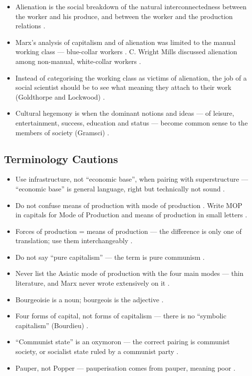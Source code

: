 \begin{itemize}
    \item Alienation is the social breakdown of the natural interconnectedness between the worker and his produce, and between the worker and the production relations .
    \item Marx's analysis of capitalism and of alienation was limited to the manual working class --- blue-collar workers . C. Wright Mills discussed alienation among non-manual, white-collar workers .
    \item Instead of categorising the working class as victims of alienation, the job of a social scientist should be to see what meaning they attach to their work (Goldthorpe and Lockwood) .
    \item Cultural hegemony is when the dominant notions and ideas --- of leisure, entertainment, success, education and status --- become common sense to the members of society (Gramsci) .
\end{itemize}

\subsection{Terminology Cautions}
\begin{itemize}
    \item Use infrastructure, not ``economic base'', when pairing with superstructure --- ``economic base'' is general language, right but technically not sound .
    \item Do not confuse means of production with mode of production . Write MOP in capitals for Mode of Production and means of production in small letters .
    \item Forces of production = means of production --- the difference is only one of translation; use them interchangeably .
    \item Do not say ``pure capitalism'' --- the term is pure communism .
    \item Never list the Asiatic mode of production with the four main modes --- thin literature, and Marx never wrote extensively on it .
    \item Bourgeoisie is a noun; bourgeois is the adjective .
    \item Four forms of capital, not forms of capitalism --- there is no ``symbolic capitalism'' (Bourdieu) .
    \item ``Communist state'' is an oxymoron --- the correct pairing is communist society, or socialist state ruled by a communist party .
    \item Pauper, not Popper --- pauperisation comes from pauper, meaning poor .
\end{itemize}


